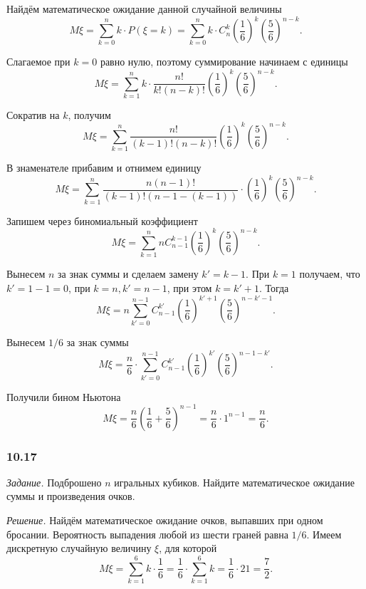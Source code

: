 Найдём математическое ожидание данной случайной величины
$$M \xi =
\sum \limits_{k=0}^n k \cdot P \left( \xi = k \right) =
\sum \limits_{k=0}^n k \cdot C_n^k \left( \frac{1}{6} \right)^k \left( \frac{5}{6} \right)^{n-k}.$$

Слагаемое при $k = 0$ равно нулю, поэтому суммирование начинаем с единицы
$$M \xi =
\sum \limits_{k=1}^n k \cdot \frac{n!}{k! \left( n-k \right)!} \left( \frac{1}{6} \right)^k \left( \frac{5}{6} \right)^{n-k}.$$

Сократив на $k$, получим
$$M \xi =
\sum \limits_{k=1}^n \frac{n!}{ \left( k-1 \right)! \left( n-k \right)! } \left( \frac{1}{6} \right)^k \left( \frac{5}{6} \right)^{n-k}.$$

В знаменателе прибавим и отнимем единицу
$$M \xi =
\sum \limits_{k=1}^n \frac{n \left( n-1 \right)!}{ \left( k-1 \right)! \left( n - 1 - \left( k-1 \right) \right) } \cdot
\left( \frac{1}{6} \right)^k \left( \frac{5}{6} \right)^{n-k}.$$

Запишем через биномиальный коэффициент
$$M \xi =
\sum \limits_{k=1}^n nC_{n-1}^{k-1} \left( \frac{1}{6} \right)^k \left( \frac{5}{6} \right)^{n-k}.$$

Вынесем $n$ за знак суммы и сделаем замену $k' = k - 1$.
При $k = 1$ получаем, что $k' = 1 - 1 = 0$, при $k = n, k' = n - 1$, при этом $k = k' + 1$.
Тогда
$$M \xi =
n \sum \limits_{k'=0}^{n-1} C_{n-1}^{k'} \left( \frac{1}{6} \right)^{k'+1} \left( \frac{5}{6} \right)^{n-k'-1}.$$

Вынесем $1/6$ за знак суммы
$$M \xi =
\frac{n}{6} \cdot \sum \limits_{k'=0}^{n-1} C_{n-1}^{k'} \left( \frac{1}{6} \right)^{k'} \left( \frac{5}{6} \right)^{n-1-k'}.$$

Получили бином Ньютона
$$M \xi =
\frac{n}{6} \left( \frac{1}{6} + \frac{5}{6} \right)^{n-1} =
\frac{n}{6} \cdot 1^{n-1} =
\frac{n}{6}.$$

\subsubsection*{10.17}

\textit{Задание.} Подброшено $n$ игральных кубиков.
Найдите математическое ожидание суммы и произведения очков.

\textit{Решение.} Найдём математическое ожидание очков, выпавших при одном бросании.
Вероятность выпадения любой из шести граней равна $1/6$.
Имеем дискретную случайную величину $ \xi $, для которой
$$M \xi =
\sum \limits_{k=1}^6 k \cdot \frac{1}{6} =
\frac{1}{6} \cdot \sum \limits_{k=1}^6 k =
\frac{1}{6} \cdot 21 =
\frac{7}{2}.$$

